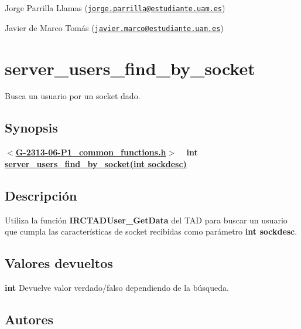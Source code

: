 \begin{DoxyItemize}
\item Jorge Parrilla Llamas (\href{mailto:jorge.parrilla@estudiante.uam.es}{\tt jorge.\+parrilla@estudiante.\+uam.\+es}) 
\item Javier de Marco Tomás (\href{mailto:javier.marco@estudiante.uam.es}{\tt javier.\+marco@estudiante.\+uam.\+es}) 
\end{DoxyItemize}\hypertarget{server_users_find_by_socket}{}\section{server\+\_\+users\+\_\+find\+\_\+by\+\_\+socket}\label{server_users_find_by_socket}
Busca un usuario por un socket dado.\hypertarget{server_users_find_by_socket_synopsis_server_users_find_by_socket}{}\subsection{Synopsis}\label{server_users_find_by_socket_synopsis_server_users_find_by_socket}
{ {\bfseries $<$\hyperlink{G-2313-06-P1__common__functions_8h}{G-\/2313-\/06-\/\+P1\+\_\+common\+\_\+functions.\+h}$>$} ~\newline
 {\bfseries int \hyperlink{G-2313-06-P1__common__functions_8c_a485e68f66db6ae4b7297d99c32afe30a}{server\+\_\+users\+\_\+find\+\_\+by\+\_\+socket(int sockdesc)}} } \hypertarget{server_users_find_by_socket_descripcion_server_users_find_by_socket}{}\subsection{Descripción}\label{server_users_find_by_socket_descripcion_server_users_find_by_socket}
Utiliza la función {\bfseries I\+R\+C\+T\+A\+D\+User\+\_\+\+Get\+Data} del T\+A\+D para buscar un usuario que cumpla las características de socket recibidas como parámetro {\bfseries int sockdesc}.\hypertarget{server_users_find_by_socket_return_server_users_find_by_socket}{}\subsection{Valores devueltos}\label{server_users_find_by_socket_return_server_users_find_by_socket}

\begin{DoxyItemize}
\item {\bfseries int} Devuelve valor verdado/falso dependiendo de la búsqueda. 
\end{DoxyItemize}\hypertarget{server_users_find_by_socket_authors_server_users_find_by_socket}{}\subsection{Autores}\label{server_users_find_by_socket_authors_server_users_find_by_socket}

